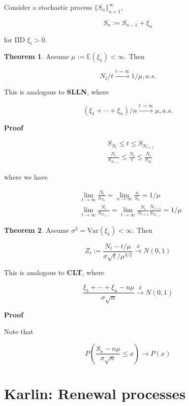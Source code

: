 \documentclass[12pt]{article}
\theoremstyle{nonumberbreak}
\begin{document}
Consider a stochastic process $\{S_n \}_{n=1}^\infty$,

$$
S_n := S_{n-1} + \xi_n
$$

for IID $\xi_i > 0$. 

\begin{theorem}
\textbf{Theorem 1}. Assume $\mu := \mathbb{E} (\xi_1) < \infty$. Then 

$$
N_t / t \overset{t \to \infty}{\to} 1/\mu, a.s.
$$

This is analogous to \textbf{SLLN}, where 

$$
(\xi_1 + \cdots + \xi_n) / n \overset{t \to \infty}{\to}  \mu, a.s.
$$
\end{theorem}


\textbf{Proof} 

$$
\begin{aligned}
&S_{N_t} \le t \le S_{N_{t+1}} \\[8pt]
&\frac{N_t}{S_{N_{t+1}}} \le \frac{N_t}{t} \le \frac{N_t}{S_{N_t}} 
\end{aligned}
$$

where we have

$$
\begin{aligned}
&\lim_{t\to\infty} \frac{N_t}{S_{N_t}} = \lim_{n\to\infty} \frac{n}{S_n} = 1/\mu \\[8pt]
&\lim_{t\to\infty} \frac{N_t}{S_{N_{t+1}}} = 
\lim_{t\to\infty} \frac{N_t}{N_{t+1}} \frac{N_{t+1}}{S_{N_{t+1}}} = 1/\mu
\end{aligned}
$$


\begin{theorem}
\textbf{Theorem 2}. Assume $\sigma^2 = \mathrm{Var} (\xi_1) < \infty$. Then

$$
Z_t := \frac{N_t - t/\mu}{\sigma \sqrt{t} / \mu^{3/2}} \overset{d}{\to} N(0,1)
$$

This is analogous to \textbf{CLT}, where 

$$
\frac{\xi_1 + \cdots + \xi_n - n\mu}{\sigma \sqrt{n}} \overset{d}{\to}  N(0,1)
$$
\end{theorem}


\textbf{Proof} 

Note that 

$$
P \left( \frac{S_n - n\mu}{\sigma \sqrt{n}} \le x \right) \to P(x)
$$


\pagebreak
\section*{Karlin: Renewal processes}
\setcounter{section}{0}
\end{document}

